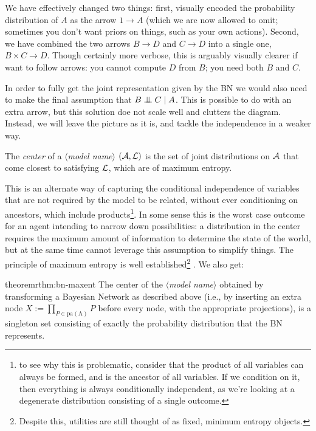 \documentclass{article}
\newcommand\modelname{{\color{blue!50!black}$\langle$\itshape model name$\rangle$ }}
\begin{document}
	We have effectively changed two things: first, visually encoded the probability distribution of $A$ as the arrow $1 \to A$ (which we are now allowed to omit; sometimes you don't want priors on things, such as your own actions). Second, we have combined the two arrows $B \to D$ and $C \to D$ into a single one, $B \times C \to D$. Though certainly more verbose, this is arguably visually clearer if want to follow arrows: you cannot compute $D$ from $B$; you need both $B$ and $C$.
	
	In order to fully get the joint representation given by the BN we would also need to make the final assumption that $B \mathrel{\perp\mspace{-10mu}\perp} C \mid A$. This is possible to do with an extra arrow, but this solution doe not scale well and clutters the diagram. Instead, we will leave the picture as it is, and tackle the independence in a weaker way.
	
	\begin{defn*}
		The \emph{center} of a \modelname $(\cal A, L)$ is the set of joint distributions on $\cal A$ that come closest to satisfying $\cal L$, which are of maximum entropy.
	\end{defn*}

	This is an alternate way of capturing the conditional independence of variables that are not required by the model to be related, without ever conditioning on ancestors, which include products\footnote{to see why this is problematic, consider that the product of all variables can always be formed, and is the ancestor of all variables. If we condition on it, then everything is always conditionally independent, as we're looking at a degenerate distribution consisting of a single outcome.}.  In some sense this is the worst case outcome for an agent intending to narrow down possibilities: a distribution in the center requires the maximum amount of information to determine the state of the world, but at the same time cannot leverage this assumption to simplify things. The principle of maximum entropy is well established\footnote{Despite this, utilities are still thought of as fixed, minimum entropy objects.} . We also get:
	
	
	\begin{restatable}{theorem}{rthm:bn-maxent} \label{rthm:bn-maxent}
		The center of the \modelname obtained by transforming a Bayesian Network as described above (i.e., by inserting an extra node $X := \prod_{P \in \mathrm{pa(A)}} P$ before every node, with the appropriate projections), is a singleton set consisting of exactly the probability distribution that the BN represents.
	\end{restatable}
\end{document}
